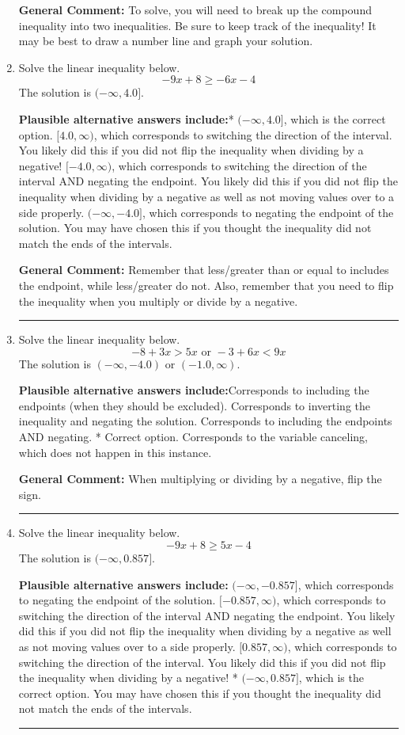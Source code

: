 \documentclass{extbook}[14pt]
\newcommand{\litem}[1]{\item #1

\rule{\textwidth}{0.4pt}}
\begin{document}
\begin{enumerate}
{\textbf{General Comment:} To solve, you will need to break up the compound inequality into two inequalities. Be sure to keep track of the inequality! It may be best to draw a number line and graph your solution.
}
\litem{
Solve the linear inequality below.
\[ -9x + 8 \geq -6x -4 \]The solution is \( (-\infty, 4.0] \).\begin{enumerate}[label=\Alph*.]
\textbf{Plausible alternative answers include:}* $(-\infty, 4.0]$, which is the correct option.
 $[4.0, \infty)$, which corresponds to switching the direction of the interval. You likely did this if you did not flip the inequality when dividing by a negative!
 $[-4.0, \infty)$, which corresponds to switching the direction of the interval AND negating the endpoint. You likely did this if you did not flip the inequality when dividing by a negative as well as not moving values over to a side properly.
 $(-\infty, -4.0]$, which corresponds to negating the endpoint of the solution.
You may have chosen this if you thought the inequality did not match the ends of the intervals.
\end{enumerate}

\textbf{General Comment:} Remember that less/greater than or equal to includes the endpoint, while less/greater do not. Also, remember that you need to flip the inequality when you multiply or divide by a negative.
}
\litem{
Solve the linear inequality below.
\[ -8 + 3 x > 5 x \text{ or } -3 + 6 x < 9 x \]The solution is \( (-\infty, -4.0) \text{ or } (-1.0, \infty) \).\begin{enumerate}[label=\Alph*.]
\textbf{Plausible alternative answers include:}Corresponds to including the endpoints (when they should be excluded).
Corresponds to inverting the inequality and negating the solution.
Corresponds to including the endpoints AND negating.
 * Correct option.
Corresponds to the variable canceling, which does not happen in this instance.
\end{enumerate}

\textbf{General Comment:} When multiplying or dividing by a negative, flip the sign.
}
\litem{
Solve the linear inequality below.
\[ -9x + 8 \geq 5x -4 \]The solution is \( (-\infty, 0.857] \).\begin{enumerate}[label=\Alph*.]
\textbf{Plausible alternative answers include:} $(-\infty, -0.857]$, which corresponds to negating the endpoint of the solution.
 $[-0.857, \infty)$, which corresponds to switching the direction of the interval AND negating the endpoint. You likely did this if you did not flip the inequality when dividing by a negative as well as not moving values over to a side properly.
 $[0.857, \infty)$, which corresponds to switching the direction of the interval. You likely did this if you did not flip the inequality when dividing by a negative!
* $(-\infty, 0.857]$, which is the correct option.
You may have chosen this if you thought the inequality did not match the ends of the intervals.
\end{enumerate}

}
\end{enumerate}
\end{document}
